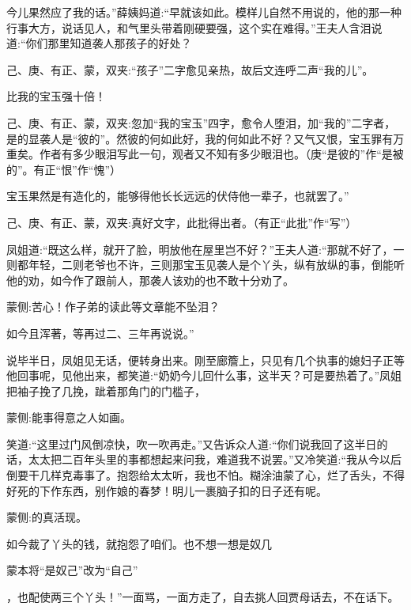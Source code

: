 \begin{parag}
今儿果然应了我的话。”薛姨妈道:“早就该如此。模样儿自然不用说的，他的那一种行事大方，说话见人，和气里头带着刚硬要强，这个实在难得。”王夫人含泪说道:“你们那里知道袭人那孩子的好处？\begin{note}己、庚、有正、蒙，双夹:“孩子”二字愈见亲热，故后文连呼二声“我的儿”。\end{note}比我的宝玉强十倍！\begin{note}己、庚、有正、蒙，双夹:忽加“我的宝玉”四字，愈令人堕泪，加“我的”二字者，是的显袭人是“彼的”。然彼的何如此好，我的何如此不好？又气又恨，宝玉罪有万重矣。作者有多少眼泪写此一句，观者又不知有多少眼泪也。（庚“是彼的”作“是被的”。有正“恨”作“愧”）\end{note}宝玉果然是有造化的，能够得他长长远远的伏侍他一辈子，也就罢了。”\begin{note}己、庚、有正、蒙，双夹:真好文字，此批得出者。（有正“此批”作“写”）\end{note}凤姐道:“既这么样，就开了脸，明放他在屋里岂不好？”王夫人道:“那就不好了，一则都年轻，二则老爷也不许，三则那宝玉见袭人是个丫头，纵有放纵的事，倒能听他的劝，如今作了跟前人，那袭人该劝的也不敢十分劝了。\begin{note}蒙侧:苦心！作子弟的读此等文章能不坠泪？\end{note}如今且浑著，等再过二、三年再说说。”
\end{parag}


\begin{parag}
    说毕半日，凤姐见无话，便转身出来。刚至廊簷上，只见有几个执事的媳妇子正等他回事呢，见他出来，都笑道:“奶奶今儿回什么事，这半天？可是要热着了。”凤姐把袖子挽了几挽，跐着那角门的门槛子，\begin{note}蒙侧:能事得意之人如画。\end{note}笑道:“这里过门风倒凉快，吹一吹再走。”又告诉众人道:“你们说我回了这半日的话，太太把二百年头里的事都想起来问我，难道我不说罢。”又冷笑道:“我从今以后倒要干几样克毒事了。抱怨给太太听，我也不怕。糊涂油蒙了心，烂了舌头，不得好死的下作东西，别作娘的春梦！明儿一裹脑子扣的日子还有呢。\begin{note}蒙侧:的真活现。\end{note}如今裁了丫头的钱，就抱怨了咱们。也不想一想是奴几\begin{note}蒙本将“是奴己”改为“自己”\end{note}，也配使两三个丫头！”一面骂，一面方走了，自去挑人回贾母话去，不在话下。
\end{parag}


